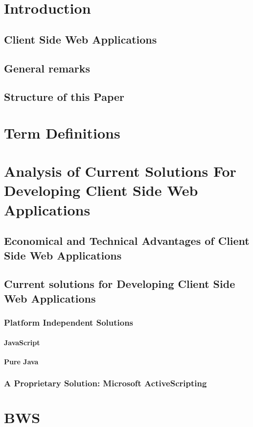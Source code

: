 \section{Introduction}
 \subsection{Client Side Web Applications}
 \subsection{General remarks}
 \subsection{Structure of this Paper}
\section{Term Definitions}
\section{Analysis of Current Solutions For Developing Client Side Web Applications}
 \subsection{Economical and Technical Advantages of Client Side Web Applications}
 \subsection{Current solutions for Developing Client Side Web Applications}
  \subsubsection{Platform Independent Solutions}
   \paragraph{JavaScript}
   \paragraph{Pure Java}
  \subsubsection{A Proprietary Solution: Microsoft ActiveScripting}
\section{BWS}
